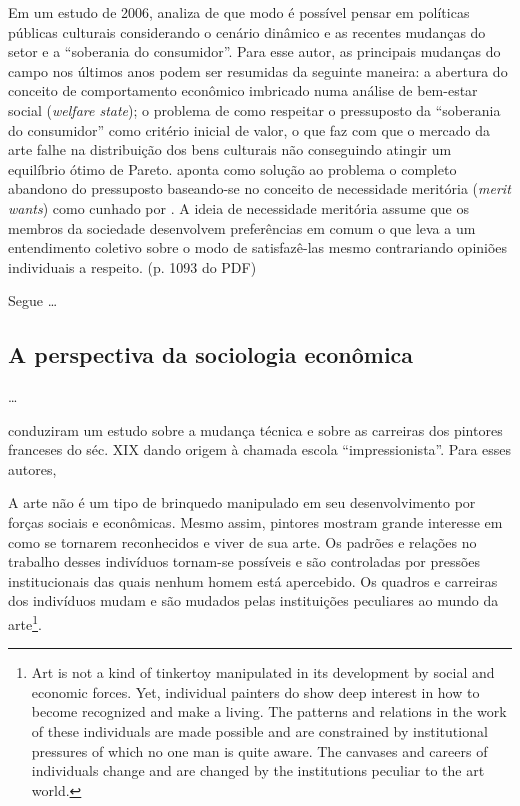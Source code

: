 \documentclass[a4paper, 12pt, openright, oneside, german, french, english, brazil]{abntex2}
\begin{document}
	Em um estudo de 2006,  analiza de que modo é possível pensar em políticas públicas culturais considerando o cenário dinâmico e as recentes mudanças do setor e a ``soberania do consumidor''. Para esse autor, as principais mudanças do campo nos últimos anos podem ser resumidas da seguinte maneira: a abertura do conceito de comportamento econômico imbricado numa análise de bem-estar social (\textit{welfare state}); o problema de como respeitar o pressuposto da ``soberania do consumidor'' como critério inicial de valor, o que faz com que o mercado da arte falhe na distribuição dos bens culturais não conseguindo atingir um equilíbrio ótimo de Pareto.  aponta como solução ao problema o completo abandono do pressuposto baseando-se no conceito de necessidade meritória (\textit{merit wants}) como cunhado por . A ideia de necessidade meritória assume que os membros da sociedade desenvolvem preferências em comum o que leva a um entendimento coletivo sobre o modo de satisfazê-las mesmo contrariando opiniões individuais a respeito. (p. 1093 do PDF)
	
	Segue \ldots
	
	
	
	
	
	
	
	
	
	
	
	\subsection{A perspectiva da sociologia econômica}
	\ldots
	
	
	
	
	
	
	 conduziram um estudo sobre a mudança técnica e sobre as carreiras dos pintores franceses do séc. XIX dando origem à chamada escola ``impressionista''. Para esses autores,
	
	\begin{citacao}
		A arte não é um tipo de brinquedo manipulado em seu desenvolvimento por forças sociais e econômicas. Mesmo assim, pintores mostram grande interesse em como se tornarem reconhecidos e viver de sua arte. Os padrões e relações no trabalho desses indivíduos tornam-se possíveis e são controladas por pressões institucionais das quais nenhum homem está apercebido. Os quadros e carreiras dos indivíduos mudam e são mudados pelas instituições peculiares ao mundo da arte\footnote{Art is not a kind of tinkertoy manipulated in its development by social and economic forces. Yet, individual painters do show deep interest in how to become recognized and make a living. The patterns and relations in the work of these individuals are made possible and are constrained by institutional pressures of which no one man is quite aware. The canvases and careers of individuals change and are changed by the institutions peculiar to the art world.}. \cite[p. xxi]{white1993canvases}
	\end{citacao}
	
\end{document}
